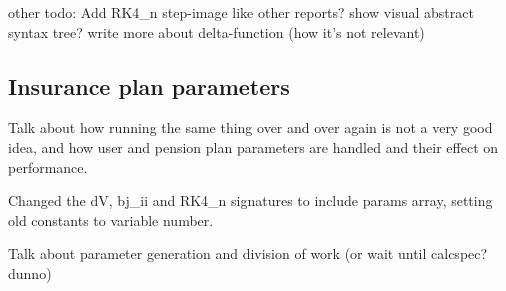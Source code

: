 other todo: 
	Add RK4\_n step-image like other reports? 
	show visual abstract syntax tree? 
	write more about delta-function (how it's not relevant)



\subsection{Insurance plan parameters}
Talk about how running the same thing over and over again is not a very good idea, and how user and pension plan parameters are handled and their effect on performance.

Changed the dV, bj\_ii and RK4\_n signatures to include params array, setting old constants to variable number.

Talk about parameter generation and division of work (or wait until calcspec? dunno)